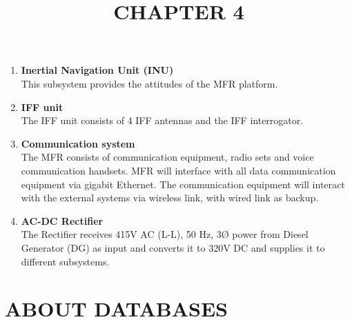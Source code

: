 \documentclass[14pt]{article} %
\begin{document}
\begin{enumerate}
\item \textbf {Inertial Navigation Unit (INU)}
\\	This subsystem provides the attitudes of the MFR platform.

\item \textbf {IFF unit}
\\	The IFF unit consists of 4 IFF antennas and the IFF interrogator.

\item \textbf {Communication system}
\\       The MFR consists of communication equipment, radio sets and voice communication handsets. MFR will interface with all data communication equipment via gigabit Ethernet. The communication equipment will interact with the external systems via wireless link, with wired link as backup.
	
\item \textbf {AC-DC Rectifier}
\\     The Rectifier receives 415V AC (L-L), 50 Hz, 3Ø power from Diesel Generator (DG) as input and converts it to 320V DC and supplies it to different subsystems.

\end{enumerate}
\pagebreak

\title{CHAPTER 4}
\maketitle
\section{ABOUT DATABASES}
\end{document}
